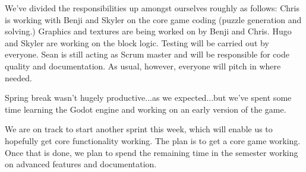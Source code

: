 \documentclass[12pt]{article}
\begin{document}
We've divided the responsibilities up amongst ourselves roughly as follows: Chris is working with Benji and Skyler on the core game coding (puzzle generation and solving.) Graphics and textures are being worked on by Benji and Chris. Hugo and Skyler are working on the block logic. Testing will be carried out by everyone. Sean is still acting as Scrum master and will be responsible for code quality and documentation. As usual, however, everyone will pitch in where needed.

Spring break wasn't hugely productive...as we expected...but we've spent some time learning the Godot engine and working on an early version of the game.

We are on track to start another sprint this week, which will enable us to hopefully get core functionality working. The plan is to get a core game working. Once that is done, we plan to spend the remaining time in the semester working on advanced features and documentation.



\end{document}
